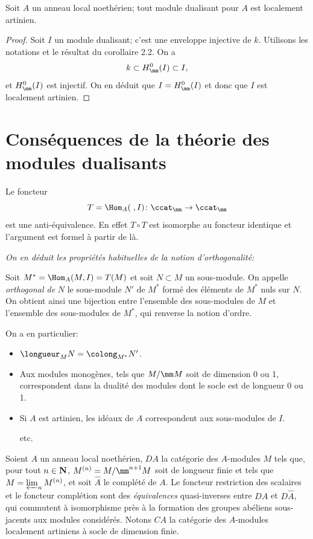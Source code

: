 \begin{corollaire} \label{IV.4.9}
Soit $A$ un anneau local noeth\'erien; tout module dualisant pour $A$ est localement artinien.
\end{corollaire}

\begin{proof}
Soit $I$ un module dualisant; c'est une enveloppe injective de $k$. Utilisons les notations et le r\'esultat du corollaire 2.2. On a
$$
k\subset H^{0}_{\mm}(I)\subset I,
$$
et $H^{0}_{\mm}(I)$ est injectif. On en d\'eduit que $I=H^{0}_{\mm}(I)$ et donc que $I$ est localement artinien.
\skipqed
\end{proof}

\section{Cons\'equences de la th\'eorie des modules dualisants} \label{IV.5}

Le foncteur\pageoriginale
$$
T=\Hom_{A}(\;, I)\colon \ccat_{\mm}\to \ccat_{\mm}
$$
est une anti-\'equivalence. En effet $T\circ T$ est isomorphe au foncteur identique et l'argument est formel \`a partir de l\`a.

\emph{On en d\'eduit les propri\'et\'es habituelles de la notion d'orthogonalit\'e:}

Soit $M^{*}=\Hom_{A}(M, I)=T(M)$ et soit $N\subset M$ un sous-module. On appelle \emph{orthogonal de} $N$ le sous-module $N'$ de $M^{*}$ form\'e des \'el\'ements de $M^*$ nuls sur $N$. On obtient ainsi une bijection entre l'ensemble des sous-modules de $M$ et l'ensemble des sous-modules de $M^{*}$, qui renverse la notion d'ordre.

On a en particulier:
\begin{itemize}
\item
$\longueur_{M}N=\colong_{M^{*}}N'$.
\item
Aux modules monog\`enes, \ie tels que $M/\mm M$ soit de dimension 0 ou 1, correspondent dans la dualit\'e des modules dont le socle est de longueur 0 ou 1.
\item
Si $A$ est artinien, les id\'eaux de $A$ correspondent aux sous-modules de $I$.
\par\hfill etc.
\end{itemize}

\smallskip
Soient $A$ un anneau local noeth\'erien, $DA$ la cat\'egorie des $A$-modules $M$ tels que, pour tout $n\in {\bf N}$, $M^{(n)}=M/\mm^{n+1}M$ soit de longueur finie et tels que $M=\varprojlim_{n}M^{(n)}$, et soit $\hat{A}$ le compl\'et\'e de $A$. Le foncteur restriction des scalaires et le foncteur compl\'etion sont des \emph{\'equivalences} quasi-inverses entre $DA$ et $D\hat{A}$, qui commutent \`a isomorphisme pr\`es \`a la formation des groupes ab\'eliens sous-jacents aux modules consid\'er\'es. Notons $CA$ la cat\'egorie des $A$-modules localement artiniens \`a socle de dimension finie.

